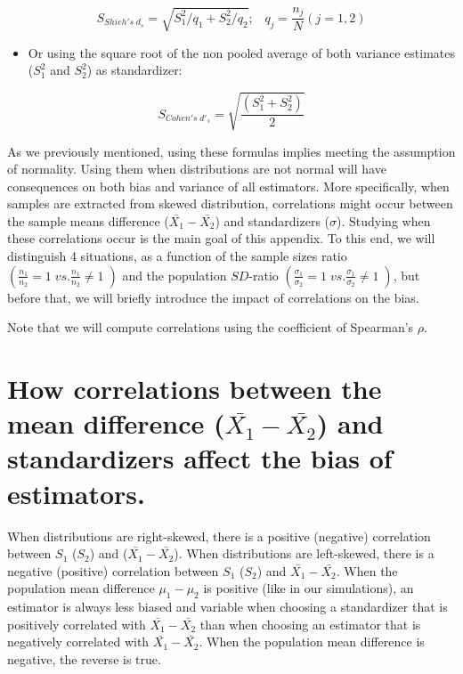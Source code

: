 \documentclass[
  man]{apa6}
\providecommand{\tightlist}{%
  \setlength{\itemsep}{0pt}\setlength{\parskip}{0pt}}
\begin{document}
\begin{equation} 
S_{Shieh's \; d_s} = \sqrt{S_1^2/q_1+S_2^2/q_2}; \;\;\; q_j=\frac{n_j}{N} (j=1,2)
\label{eq:Shiehds}
\end{equation}

\begin{itemize}
\tightlist
\item
  Or using the square root of the non pooled average of both variance estimates (\(S^2_1\) and \(S^2_2\)) as standardizer:
\end{itemize}

\begin{equation} 
S_{Cohen's \; d'_s} = \sqrt{\frac{\left(S^2_{1}+S^2_{2} \right)}{2}}
\label{eq:cohenprimeds}
\end{equation}

As we previously mentioned, using these formulas implies meeting the assumption of normality. Using them when distributions are not normal will have consequences on both bias and variance of all estimators. More specifically, when samples are extracted from skewed distribution, correlations might occur between the sample means difference (\(\bar{X_1}-\bar{X_2}\)) and standardizers (\(\sigma\)). Studying when these correlations occur is the main goal of this appendix. To this end, we will distinguish 4 situations, as a function of the sample sizes ratio \(\left( \frac{n_1}{n_2}=1 \; vs. \frac{n_1}{n_2}\neq1\; \right)\) and the population \(SD\)-ratio \(\left( \frac{\sigma_1}{\sigma_2}=1 \; vs. \frac{\sigma_1}{\sigma_2}\neq1\; \right)\), but before that, we will briefly introduce the impact of correlations on the bias.

Note that we will compute correlations using the coefficient of Spearman's \(\rho\).

\hypertarget{how-correlations-between-the-mean-difference-barx_1-barx_2-and-standardizers-affect-the-bias-of-estimators.}{%
\section{\texorpdfstring{How correlations between the mean difference (\(\bar{X_1}-\bar{X_2}\)) and standardizers affect the bias of estimators.}{How correlations between the mean difference (\textbackslash bar\{X\_1\}-\textbackslash bar\{X\_2\}) and standardizers affect the bias of estimators.}}\label{how-correlations-between-the-mean-difference-barx_1-barx_2-and-standardizers-affect-the-bias-of-estimators.}}

When distributions are right-skewed, there is a positive (negative) correlation between \(S_1\) (\(S_2\)) and (\(\bar{X_1}-\bar{X_2}\)). When distributions are left-skewed, there is a negative (positive) correlation between \(S_1\) (\(S_2\)) and \(\bar{X_1}-\bar{X_2}\). When the population mean difference \(\mu_1-\mu_2\) is positive (like in our simulations), an estimator is always less biased and variable when choosing a standardizer that is positively correlated with \(\bar{X_1}-\bar{X_2}\) than when choosing an estimator that is negatively correlated with \(\bar{X_1}-\bar{X_2}\). When the population mean difference is negative, the reverse is true.
\end{document}
